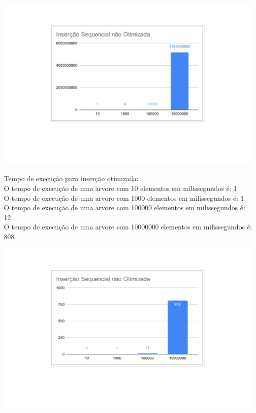         \begin{center}
            \includegraphics[scale=0.8]{Trabalho AED/fig/grafico1.pdf}
            \label{fig:Grafico 1}
        \end{center}
    Tempo de execução para inserção otimizada:\\
    O tempo de execução de uma arvore com 10 elementos em milissegundos é: 1\\
    O tempo de execução de uma arvore com 1000 elementos em milissegundos é: 1\\
    O tempo de execução de uma arvore com 100000 elementos em milissegundos é: 12\\
    O tempo de execução de uma arvore com 10000000 elementos em milissegundos é: 808\\
    
    \begin{center}
            \includegraphics[scale=0.8]{Trabalho AED/fig/grafico2.pdf}
            \label{fig:Grafico 2}
    \end{center}
         \pagebreak
